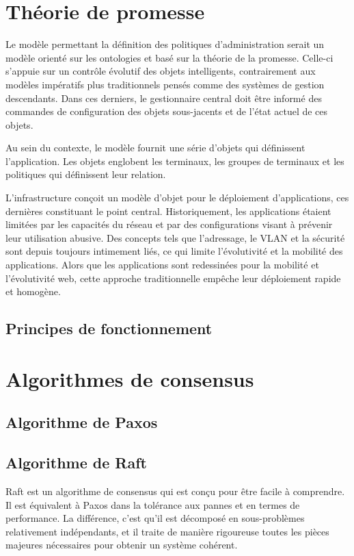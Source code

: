 \section{Théorie de promesse}

Le modèle permettant la définition des politiques d'administration serait un
modèle orienté sur les ontologies et basé sur la théorie de la promesse.
Celle-ci s'appuie sur un contrôle évolutif des objets intelligents,
contrairement aux modèles impératifs plus traditionnels pensés comme des
systèmes de gestion descendants.  Dans ces derniers, le gestionnaire central
doit être informé des commandes de configuration des objets sous-jacents et de
l'état actuel de ces objets.

Au sein du contexte, le modèle fournit une série d'objets qui définissent
l'application. Les objets englobent les terminaux, les groupes de terminaux et
les politiques qui définissent leur relation.

L'infrastructure conçoit un modèle d'objet pour le déploiement d'applications,
ces dernières constituant le point central. Historiquement, les applications
étaient limitées par les capacités du réseau et par des configurations visant à
prévenir leur utilisation abusive. Des concepts tels que l'adressage, le VLAN et
la sécurité sont depuis toujours intimement liés, ce qui limite l'évolutivité et
la mobilité des applications. Alors que les applications sont redessinées pour
la mobilité et l'évolutivité web, cette approche traditionnelle empêche leur
déploiement rapide et homogène.

\subsection{Principes de fonctionnement}

\section{Algorithmes de consensus}

\subsection{Algorithme de Paxos}

\subsection{Algorithme de Raft}

Raft est un algorithme de consensus qui est conçu pour être facile à comprendre.
Il est équivalent à Paxos dans la tolérance aux pannes et en termes de
performance. La différence, c'est qu'il est décomposé en sous-problèmes
relativement indépendants, et il traite de manière rigoureuse toutes les pièces
majeures nécessaires pour obtenir un système cohérent.

